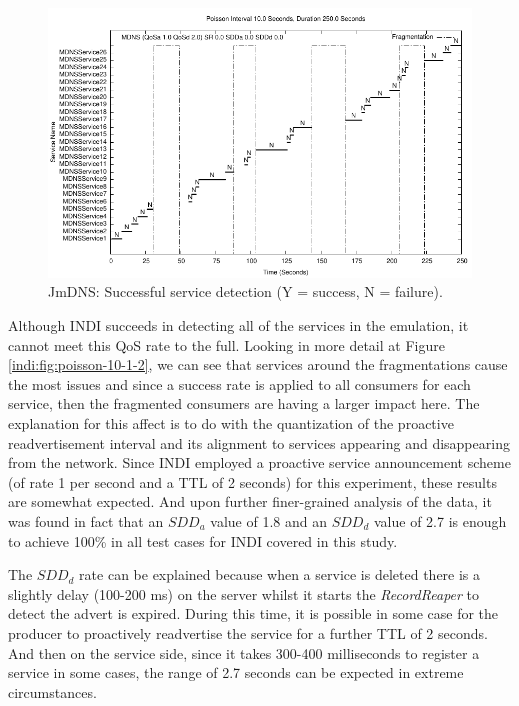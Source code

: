 \begin{figure}[htb]
\centering
\includegraphics[scale=1.0]{jmdns10-1-2-results-distribution.pdf}
\caption{JmDNS: Successful service detection (Y = success, N = failure).} 
\label{jmdns:fig:poisson-10-1-2}
\end{figure}

Although INDI succeeds in detecting all of the services in the emulation, it cannot meet this QoS rate to the full. Looking in more detail at Figure \ref{indi:fig:poisson-10-1-2}, we can see that services around the fragmentations cause the most issues and since a success rate is applied to all consumers for each service, then the fragmented consumers are having a larger impact here.   The explanation for this affect is to do with the quantization of the proactive readvertisement interval and its alignment to services appearing and disappearing from the network.  Since INDI employed a proactive service announcement scheme (of rate 1 per second and a TTL of 2 seconds) for this experiment, these results are somewhat expected.   And upon further finer-grained analysis of the data, it was found in fact that an $SDD_{a}$ value of 1.8 and  an $SDD_{d}$ value of 2.7 is enough to achieve 100\% in all test cases for INDI covered in this study.  

The $SDD_{d}$ rate can be explained because when a service is deleted there is a slightly delay (100-200 ms) on the server whilst it starts the \emph{RecordReaper}  to detect the advert is expired.  During this time, it is possible in some case for the producer to proactively readvertise the service for a further TTL of 2 seconds.  And then on the service side,  since it takes 300-400 milliseconds to register a service in some cases, the range of 2.7 seconds can be expected in extreme circumstances.   

